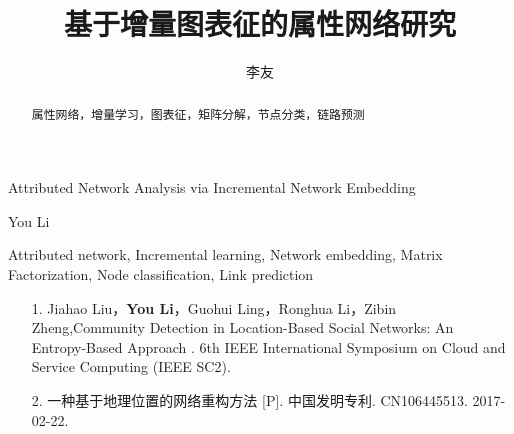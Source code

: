 \documentclass{sysuthesis} %
\numberwithin{algorithm}{chapter}
\theoremstyle{plain}
\theoremstyle{definition}
\theoremstyle{definition}
\begin{document}
\title{基于增量图表征的属性网络研究}{}{Attributed Network Analysis via Incremental Network Embedding}{}

\author{李友}{You Li}




\maketitle

\begin{abstract}{属性网络，增量学习，图表征，矩阵分解，节点分类，链路预测}
  
\end{abstract}

\begin{englishabstract}{Attributed network, Incremental learning, Network embedding, Matrix Factorization, Node classification, Link prediction}
  
\end{englishabstract}

\tableofcontents


\begin{Main} %










%

%

\end{Main} %






\newpage
\printindex %

\begin{Resume}
\begin{itemize}
\item [1.] Jiahao Liu，\textbf{You Li}，Guohui Ling，Ronghua Li，Zibin Zheng,Community Detection in Location-Based Social Networks: An Entropy-Based Approach . 6th IEEE International Symposium on Cloud and Service Computing (IEEE SC2). 
\item [2.]  一种基于地理位置的网络重构方法 [P]. 中国发明专利. CN106445513. 2017-02-22.


\end{itemize}
\end{Resume}
\end{document}
